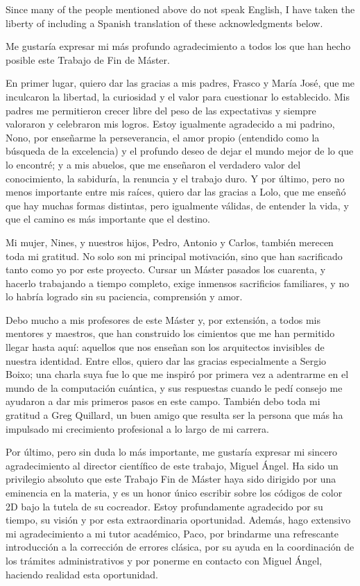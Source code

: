 \vspace{1cm}
Since many of the people mentioned above do not speak English, I have taken the liberty of including a Spanish translation of these acknowledgments below.

\begin{itshape}

Me gustaría expresar mi más profundo agradecimiento a todos los que han hecho posible este Trabajo de Fin de Máster.

En primer lugar, quiero dar las gracias a mis padres, Frasco y María José, que me inculcaron la libertad, la curiosidad y el valor para cuestionar lo establecido. Mis padres me permitieron crecer libre del peso de las expectativas y siempre valoraron y celebraron mis logros. Estoy igualmente agradecido a mi padrino, Nono, por enseñarme la perseverancia, el amor propio (entendido como la búsqueda de la excelencia) y el profundo deseo de dejar el mundo mejor de lo que lo encontré; y a mis abuelos, que me enseñaron el verdadero valor del conocimiento, la sabiduría, la renuncia y el trabajo duro. Y por último, pero no menos importante entre mis raíces, quiero dar las gracias a Lolo, que me enseñó que hay muchas formas distintas, pero igualmente válidas, de entender la vida, y que el camino es más importante que el destino.

Mi mujer, Nines, y nuestros hijos, Pedro, Antonio y Carlos, también merecen toda mi gratitud. No solo son mi principal motivación, sino que han sacrificado tanto como yo por este proyecto. Cursar un Máster pasados los cuarenta, y hacerlo trabajando a tiempo completo, exige inmensos sacrificios familiares, y no lo habría logrado sin su paciencia, comprensión y amor.

Debo mucho a mis profesores de este Máster y, por extensión, a todos mis mentores y maestros, que han construido los cimientos que me han permitido llegar hasta aquí: aquellos que nos enseñan son los arquitectos invisibles de nuestra identidad. Entre ellos, quiero dar las gracias especialmente a Sergio Boixo; una charla suya fue lo que me inspiró por primera vez a adentrarme en el mundo de la computación cuántica, y sus respuestas cuando le pedí consejo me ayudaron a dar mis primeros pasos en este campo. También debo toda mi gratitud a Greg Quillard, un buen amigo que resulta ser la persona que más ha impulsado mi crecimiento profesional a lo largo de mi carrera.

Por último, pero sin duda lo más importante, me gustaría expresar mi sincero agradecimiento al director científico de este trabajo, Miguel Ángel. Ha sido un privilegio absoluto que este Trabajo Fin de Máster haya sido dirigido por una eminencia en la materia, y es un honor único escribir sobre los códigos de color 2D bajo la tutela de su cocreador. Estoy profundamente agradecido por su tiempo, su visión y por esta extraordinaria oportunidad. Además, hago extensivo mi agradecimiento a mi tutor académico, Paco, por brindarme una refrescante introducción a la corrección de errores clásica, por su ayuda en la coordinación de los trámites administrativos y por ponerme en contacto con Miguel Ángel, haciendo realidad esta oportunidad.
\end{itshape}
